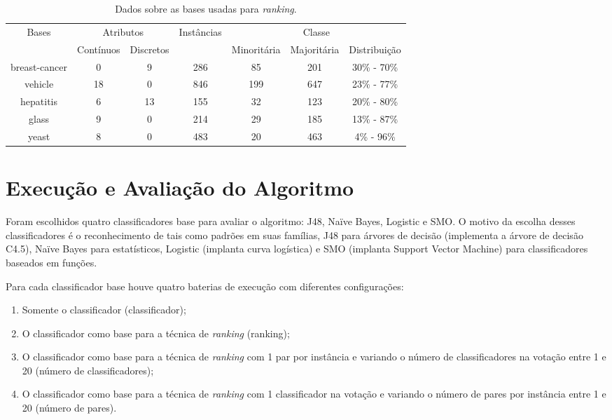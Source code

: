 \begin{table}[h]

    \begin{tabular}{c c c c c c c}
        \hline
        \multirow{2}{*}{Bases} & \multicolumn{2}{c}{Atributos} & \multirow{2}{*}{Instâncias} & \multicolumn{3}{c}{Classe} \\ \cline{2-3} \cline{5-7}
        & {\small Contínuos} & {\small Discretos} & & {\small Minoritária} & {\small Majoritária} & {\small Distribuição}\\
        \hline
        breast-cancer & 0 & 9 & 286 & 85 & 201 & 30\% - 70\%\\
        vehicle & 18 & 0  & 846 & 199 & 647 & 23\% - 77\%\\
        hepatitis & 6 & 13  & 155 & 32 & 123 & 20\% - 80\%\\
        glass & 9 & 0  & 214 & 29 & 185 & 13\% - 87\%\\
        yeast & 8 & 0  & 483 & 20 & 463 & 4\% - 96\%\\
        \hline
    \end{tabular}

    \caption{Dados sobre as bases usadas para \emph{ranking}. \label{tbl:caracteristicas}}
\end{table}

\section{Execução e Avaliação do Algoritmo}
\label{sec:avaliacao}

Foram escolhidos quatro classificadores base para avaliar o algoritmo: J48, Naïve Bayes, Logistic e SMO. O motivo da escolha desses classificadores é o reconhecimento de tais como padrões em suas famílias, J48 para árvores de decisão (implementa a árvore de decisão C4.5), Naïve Bayes para estatísticos, Logistic (implanta curva logística) e SMO (implanta Support Vector Machine) para classificadores baseados em funções.

Para cada classificador base houve quatro baterias de execução com diferentes configurações:

\begin{enumerate}
    \item Somente o classificador (classificador);
    \item O classificador como base para a técnica de \emph{ranking} (ranking);
    \item O classificador como base para a técnica de \emph{ranking} com 1 par por instância e variando o número de classificadores na votação entre 1 e 20 (número de classificadores);
    \item O classificador como base para a técnica de \emph{ranking} com 1 classificador na votação e variando o número de pares por instância entre 1 e 20 (número de pares).
\end{enumerate}

